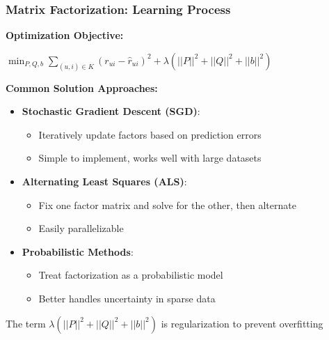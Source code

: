 \documentclass{beamer}
\begin{document}
\begin{frame}
\frametitle{Matrix Factorization: Learning Process}

\textbf{Optimization Objective:}
\begin{center}
$\min_{P,Q,b} \sum_{(u,i) \in K} (r_{ui} - \hat{r}_{ui})^2 + \lambda(||P||^2 + ||Q||^2 + ||b||^2)$
\end{center}

\vspace{0.3cm}
\textbf{Common Solution Approaches:}
\begin{itemize}
    \item \textbf{Stochastic Gradient Descent (SGD)}:
    \begin{itemize}
        \item Iteratively update factors based on prediction errors
        \item Simple to implement, works well with large datasets
    \end{itemize}
    
    \item \textbf{Alternating Least Squares (ALS)}:
    \begin{itemize}
        \item Fix one factor matrix and solve for the other, then alternate
        \item Easily parallelizable
    \end{itemize}
    
    \item \textbf{Probabilistic Methods}:
    \begin{itemize}
        \item Treat factorization as a probabilistic model
        \item Better handles uncertainty in sparse data
    \end{itemize}
\end{itemize}

\vspace{0.2cm}
The term $\lambda(||P||^2 + ||Q||^2 + ||b||^2)$ is regularization to prevent overfitting
\end{frame}
\end{document}
